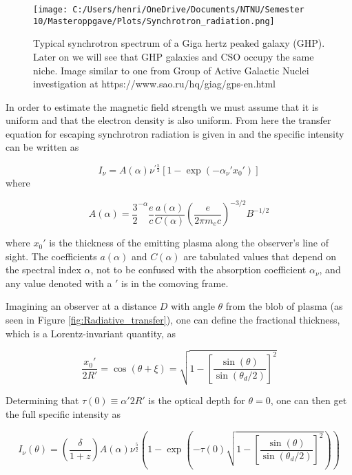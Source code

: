 \begin{figure}
    \centering
    \texttt{[image: C:/Users/henri/OneDrive/Documents/NTNU/Semester 10/Masteroppgave/Plots/Synchrotron\_radiation.png]}
    \caption{Typical synchrotron spectrum of a Giga hertz peaked galaxy (GHP). Later on we will see that GHP galaxies and CSO occupy the same niche. Image similar to one from Group of Active Galactic Nuclei investigation at https://www.sao.ru/hq/giag/gps-en.html }
    \label{fig:synchrotron_spectrum}
\end{figure}

In order to estimate the magnetic field strength we must assume that it is uniform and that the electron density is also uniform. From here the transfer equation for escaping synchrotron radiation is given in \cite{Hirotani_2005} and the specific intensity can be written as 

\begin{equation}
    I_\nu = A(\alpha) \nu^{'\frac{5}{2}}[1-\exp(-\alpha_{\nu}'x_0' )] 
\end{equation}
where 

\begin{equation}
    A(\alpha) = \frac{3}{2}^{-\alpha}\frac{e}{c}\frac{a(\alpha)}{C(\alpha)}\left(\frac{e}{2\pi m_e c}\right)^{-3/2}B^{-1/2}
\end{equation}

where $x_0'$ is the thickness of the emitting plasma along the observer's line of sight. The coefficients $a(\alpha)$ and $C(\alpha)$ are tabulated values that depend on the spectral index $\alpha$, not to be confused with the absorption coefficient $\alpha_{\nu}$, and any value denoted with a $'$ is in the comoving frame. 

Imagining an observer at a distance $D$ with angle $\theta$ from the blob of plasma (as seen in Figure \ref{fig:Radiative_transfer}), one can define the fractional thickness, which is a Lorentz-invariant quantity, as

\begin{equation}
    \frac{x_0'}{2R'} = \cos(\theta + \xi) = \sqrt{1-\left[\frac{\sin(\theta)}{\sin(\theta_d/2)}\right]^2}
\end{equation}

Determining that $\tau(0) \equiv  \alpha'2R'$ is the optical depth for $\theta = 0$, one can then get the full specific intensity as

\begin{equation}
    I_\nu(\theta) = \left( \frac{\delta}{1+z}\right)A(\alpha)\nu^{\frac{5}{2}}\left(1-\exp \left(-\tau(0)\sqrt{1-\left[\frac{\sin(\theta)}{\sin(\theta_d/2)}\right]^2}\right)\right)
\end{equation}

